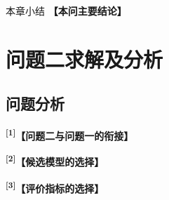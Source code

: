 \documentclass[UTF8,a4paper,12pt,fontset=fandol]{ctexart}
\newif\ifDraftAid
\newcommand{\ph}[1]{\textbf{\color{phg}【#1】}}
\newcommand{\detail}[1]{%
  \ifDraftAid\textnormal{\color{detailg}\small\,（参考写法：#1）}\fi}
\newcommand{\PHD}[2]{\ph{#1}\detail{#2}}
\newcommand{\SN}[1]{\textsuperscript{\color{noteg}\bfseries[#1]}}
\newcommand{\Note}[2]{\par\noindent\textbf{[#1]}\ #2}
\newcommand{\Annotated}[2]{%
\ifDraftAid
\noindent\begin{minipage}[t]{0.735\linewidth}\vspace{0pt}#1\end{minipage}\hfill
\begin{minipage}[t]{0.235\linewidth}\vspace{0pt}\footnotesize\color{noteg}\raggedright
\begin{tcolorbox}[colback=notebg,colframe=ruleg,boxrule=0.35pt,arc=1mm,left=1.2mm,right=1.2mm,top=1mm,bottom=1mm]
#2
\end{tcolorbox}\end{minipage}
\else
#1
\fi
}
\numberwithin{figure}{section}
\numberwithin{table}{section}
\begin{document}
\begin{resultbox}{本章小结}
\PHD{本问主要结论}{本章首先〔构建或完成了什么〕，涵盖〔内容概述〕。为保证〔目的〕，对〔对象〕进行了〔筛选或处理〕，即在〔方面〕选择了〔设定〕、在〔方面〕选取了〔设定〕。在数据处理方面，采用〔方法〕完成〔任务〕，并通过〔手段〕在提升〔目标A〕的同时有效缓解〔问题B〕，最终形成了〔结果〕。随后开展〔任务〕工作，从〔维度A、维度B〕全面表征〔对象特征〕。为了去除冗余、保留关键特征，本文结合多种方法进行了筛选与验证，经过对比多个筛选方案的交集，最终得到〔数量〕个兼具〔性质A〕与〔性质B〕的有效〔特征或结果〕，为后续〔任务〕奠定了坚实基础。}
\end{resultbox}

\section{问题二求解及分析}
\subsection{问题分析}
\Annotated{
\SN{1}\PHD{问题二与问题一的衔接}{在〔应用领域〕中，传统的处理或检测方法主要依赖于人工经验和基于规则的算法，这些方法往往在复杂环境下表现出较低的准确性，尤其是在面对多种工况和多类对象时，其适应性和鲁棒性较差。随着智能化和自动化的发展，数据驱动的方法逐渐成为主流，它们能够通过大量历史数据自动学习并提取特征，从而实现高效、精准的〔任务〕。这些先进技术不仅能够突破人工经验的局限，而且具有较强的适应性，能够处理复杂的、非线性的〔模式〕。}

\par\medskip
\SN{2}\PHD{候选模型的选择}{根据问题二的要求，本文在问题一提取的〔特征或数据〕基础上，基于〔机器学习与深度学习方法〕设计了一个有效的〔模型〕。通过训练模型并评估其在测试集上的表现，能够实现对〔研究对象〕的高效识别。本文不仅采用了问题一中筛选得到的特征数据作为输入，还探索了〔另一类数据〕的潜力，将其转化为〔新的表示形式〕，从而为〔任务〕提供更加细致的特征支持。整体思路流程如图〔编号〕所示。}

\par\medskip
\SN{3}\PHD{评价指标的选择}{为了全面评估不同模型的表现，本文采用多项性能评价指标，包括〔指标A、指标B、指标C〕。此外，为了进一步分析不同模型的分类效果，本文还通过〔混淆矩阵、曲线等可视化手段〕对模型性能进行分析。通过实验，本文不仅比较了多种方法在〔源域或训练集〕上的效果，也为后续〔任务〕提供了理论基础。}
}{
\Note{1}{问题二直接承接问题一结果，不必重复介绍已经完成的数据处理。}
\Note{2}{候选模型不宜过多，选取具有代表性的几种方法即可。}
\Note{3}{评价指标在模型结果前统一说明。}
}
\end{document}
